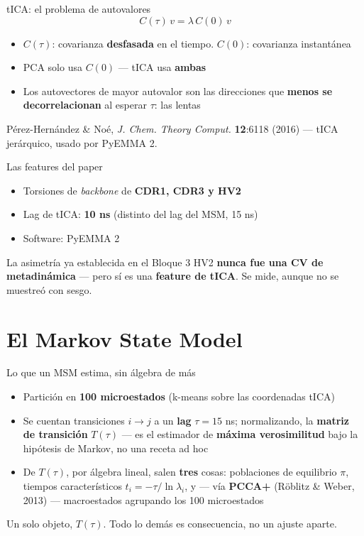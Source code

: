 \documentclass[aspectratio=169,11pt]{beamer}
\newcommand{\Fuente}[1]{{\scriptsize\color{migris} #1}}
\begin{document}
\begin{frame}{tICA: el problema de autovalores}
  $$C(\tau)\,v = \lambda\, C(0)\,v$$
  \begin{itemize}
    \item $C(\tau)$: covarianza \textbf{desfasada} en el tiempo. $C(0)$: covarianza instantánea
    \item PCA solo usa $C(0)$ — tICA usa \textbf{ambas}
    \item Los autovectores de mayor autovalor son las direcciones que \textbf{menos se decorrelacionan} al esperar $\tau$: las lentas
  \end{itemize}
  \vspace{0.6em}
  \Fuente{Pérez-Hernández \& Noé, \textit{J. Chem. Theory Comput.} \textbf{12}:6118 (2016) — tICA jerárquico, usado por PyEMMA 2.}
\end{frame}

\begin{frame}{Las features del paper}
  \begin{itemize}
    \item Torsiones de \emph{backbone} de \textbf{CDR1, CDR3 y HV2}
    \item Lag de tICA: \textbf{10 ns} (distinto del lag del MSM, 15 ns)
    \item Software: PyEMMA 2
  \end{itemize}
  \vspace{0.6em}
  \begin{alertblock}{La asimetría ya establecida en el Bloque 3}
    HV2 \textbf{nunca fue una CV de metadinámica} — pero sí es una \textbf{feature de tICA}. Se mide, aunque no se muestreó con sesgo.
  \end{alertblock}
\end{frame}

\section{El Markov State Model}

\begin{frame}{Lo que un MSM estima, sin álgebra de más}
  \begin{itemize}
    \item Partición en \textbf{100 microestados} (k-means sobre las coordenadas tICA)
    \item Se cuentan transiciones $i\to j$ a un \textbf{lag} $\tau=15$ ns; normalizando, la \textbf{matriz de transición} $T(\tau)$ — es el estimador de \textbf{máxima verosimilitud} bajo la hipótesis de Markov, no una receta ad hoc
    \item De $T(\tau)$, por álgebra lineal, salen \textbf{tres} cosas: poblaciones de equilibrio $\pi$, tiempos característicos $t_i=-\tau/\ln\lambda_i$, y — vía \textbf{PCCA+} (Röblitz \& Weber, 2013) — macroestados agrupando los 100 microestados
  \end{itemize}
  \vspace{0.6em}
  \centering \alert{\large Un solo objeto, $T(\tau)$. Todo lo demás es consecuencia, no un ajuste aparte.}
\end{frame}
\end{document}

